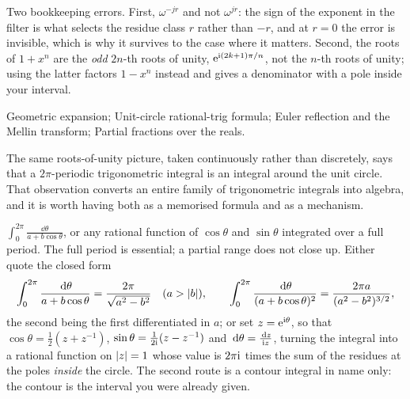 \begin{trap}
Two bookkeeping errors. First, $\omega^{-jr}$ and not $\omega^{jr}$: the sign of the exponent in the filter is what selects the residue class $r$ rather than $-r$, and at $r=0$ the error is invisible, which is why it survives to the case where it matters. Second, the roots of $1+x^{n}$ are the \emph{odd} $2n$-th roots of unity, $\mathrm{e}^{\mathrm{i}(2k+1)\pi/n}$, not the $n$-th roots of unity; using the latter factors $1-x^{n}$ instead and gives a denominator with a pole inside your interval.
\end{trap}

\begin{seealsob}Geometric expansion; Unit-circle rational-trig formula; Euler reflection and the Mellin transform; Partial fractions over the reals.\end{seealsob}

The same roots-of-unity picture, taken continuously rather than discretely, says that a $2\pi$-periodic trigonometric integral is an integral around the unit circle. That observation converts an entire family of trigonometric integrals into algebra, and it is worth having both as a memorised formula and as a mechanism.

\cue $\int_0^{2\pi}\frac{\dd\theta}{a+b\cos\theta}$, or any rational function of $\cos\theta$ and $\sin\theta$ integrated over a full period. The full period is essential; a partial range does not close up.
\method Either quote the closed form
\[\int_0^{2\pi}\frac{\,\mathrm{d}\theta}{a+b\cos\theta}=\frac{2\pi}{\sqrt{a^{2}-b^{2}}}\quad(a>\left\lvert b\right\rvert),\qquad
\int_0^{2\pi}\frac{\,\mathrm{d}\theta}{(a+b\cos\theta)^{2}}=\frac{2\pi a}{(a^{2}-b^{2})^{3/2}},\]
the second being the first differentiated in $a$; or set $z=\mathrm{e}^{\mathrm{i}\theta}$, so that $\cos\theta=\tfrac12(z+z^{-1})$, $\sin\theta=\tfrac{1}{2\mathrm{i}}(z-z^{-1})$ and $\,\mathrm{d}\theta=\tfrac{\,\mathrm{d} z}{\mathrm{i} z}$, turning the integral into a rational function on $\left\lvert z\right\rvert=1$ whose value is $2\pi\mathrm{i}$ times the sum of the residues at the poles \emph{inside} the circle. The second route is a contour integral in name only: the contour is the interval you were already given.

